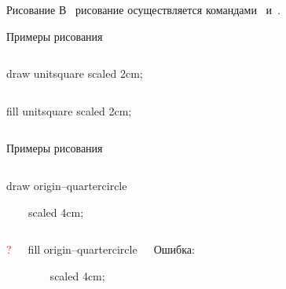 
\begin{frame}{Рисование}
\large
В~ рисование осуществляется командами
~и~.
\end{frame}

\begin{frame}{Примеры рисования}
\begin{columns}
\centerline{}%
\begin{programlisting}
\alert{draw} unitsquare scaled 2cm;
\end{programlisting}
\end{columns}
\bigskip
\begin{columns}
\centerline{}%
\begin{programlisting}
\alert{fill} unitsquare scaled 2cm;
\end{programlisting}
\end{columns}
\end{frame}

\begin{frame}{Примеры рисования}
\begin{columns}
\centerline{}%
\begin{programlisting}
\alert{draw} origin--quartercircle\par
~~~~scaled 4cm;
\end{programlisting}
\end{columns}
\bigskip
\begin{columns}
\centerline{\fontsize{48}{56}\selectfont\textcolor{red}{?}}%
\begin{programlisting}
\alert{fill} origin--quartercircle\par
~~~~scaled 4cm;
\end{programlisting}
Ошибка:
\begin{screen}
\strut
{}%
%
\end{screen}
\end{columns}
\end{frame}

